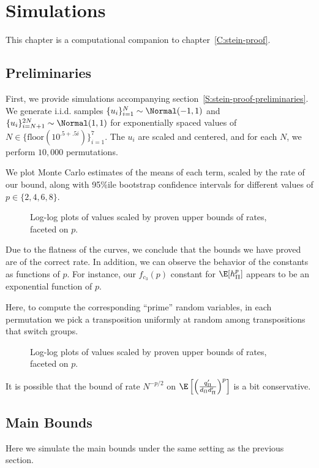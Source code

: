 \chapter{Simulations}
\label{C:simulations}
This chapter is a computational companion to chapter~\ref{C:stein-proof}.  

\section{Preliminaries}
First, we provide simulations accompanying section~\ref{S:stein-proof-preliminaries}.  We generate 
i.i.d. samples $\{u_i\}_{i=1}^{N} \sim \Normal(-1, 1)$ and $\{u_i\}_{i=N+1}^{2N} \sim \Normal(1, 1)$
for exponentially spaced values of $N \in \{\text{floor}(10^{.5+.5i})\}_{i=1}^7$.  The $u_i$ are scaled
and centered, and for each $N$, we perform $10,000$ permutations.  

We plot Monte Carlo estimates of the means of each term, scaled by the rate of our bound, along with
95\%ile bootstrap confidence intervals for different values of $p \in \{2, 4, 6, 8\}$.

\begin{figure}[!ht]
  \centering
  
  \caption{Log-log plots of values scaled by proven upper bounds of rates, faceted on $p$.}
\end{figure}
Due to the flatness of the curves, we conclude that the bounds we have proved are of the correct
rate.  In addition, we can observe the behavior of the constants as functions of $p$.  For instance,
our $f_{c_3}(p)$ constant for $\E [h_{\Pi}^p]$ appears to be an exponential function of $p$.
\clearpage

Here, to compute the corresponding ``prime'' random variables, in each permutation we pick a
transposition uniformly at random among transpositions that switch groups.

\begin{figure}[!ht]
  \centering
  
  \caption{Log-log plots of values scaled by proven upper bounds of rates, faceted on $p$.}
\end{figure}
It is possible that the bound of rate $N^{-p/2}$ on 
$\E \left [ \left ( \frac{q_{\Pi}'}{d_{\Pi}d_{\Pi}'} \right )^p \right ]$ is a bit conservative.
\clearpage

\section{Main Bounds}
Here we simulate the main bounds under the same setting as the previous section.  
